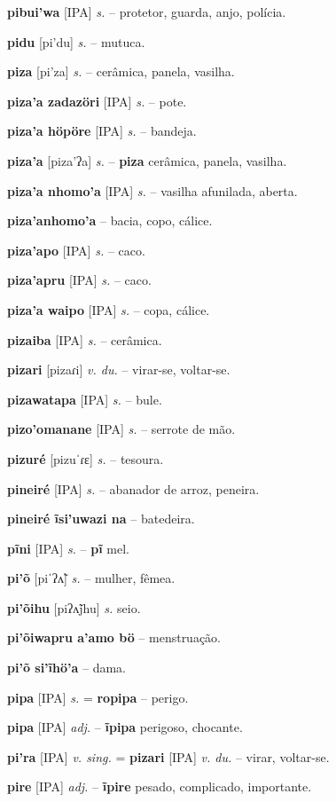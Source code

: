 \textbf{pibui'wa} [IPA] \textit{s.} -- protetor, guarda, anjo, polícia.

\textbf{pidu} [pi'du] \textit{s.} -- mutuca.

\textbf{piza} [pi'za] \textit{s.} -- cerâmica, panela, vasilha.

\textbf{piza'a zadazöri} [IPA] \textit{s.} -- pote.

\textbf{piza'a höpöre} [IPA] \textit{s.} -- bandeja.

\textbf{piza'a} [piza'ʔa] \textit{s.} -- \textbf{piza} cerâmica, panela, vasilha.

\textbf{piza'a nhomo'a} [IPA] \textit{s.} -- vasilha afunilada, aberta.

\textbf{piza'anhomo'a} -- bacia, copo, cálice.

\textbf{piza'apo} [IPA] \textit{s.} -- caco.

\textbf{piza'apru} [IPA] \textit{s.} -- caco.

\textbf{piza'a waipo} [IPA] \textit{s.} -- copa, cálice.

\textbf{pizaiba} [IPA] \textit{s.} -- cerâmica.

\textbf{pizari} [pizaɾi] \textit{v. du.} -- virar-se, voltar-se.

\textbf{pizawatapa} [IPA] \textit{s.} -- bule.

\textbf{pizo'omanane} [IPA] \textit{s.} -- serrote de mão.

\textbf{pizuré} [pizuˈɾɛ] \textit{s.} -- tesoura.

\textbf{pineiré} [IPA] \textit{s.} -- abanador de arroz, peneira.

\textbf{pineiré ĩsi'uwazi na} -- batedeira.

\textbf{pĩni} [IPA] \textit{s.} -- \textbf{pĩ} mel.

\textbf{pi'õ} [piˈʔʌ̃] \textit{s.} -- mulher, fêmea.

\textbf{pi'õihu} [piʔʌ̃jhu] \textit{s.} seio.

\textbf{pi'õiwapru a'amo bö} -- menstruação.

\textbf{pi'õ si'ĩhö'a} -- dama.

\textbf{pipa} [IPA] \textit{s.} = \textbf{ropipa} -- perigo.

\textbf{pipa} [IPA] \textit{adj.} -- \textbf{ĩpipa} perigoso, chocante.

\textbf{pi'ra} [IPA] \textit{v. sing.} = \textbf{pizari} [IPA] \textit{v. du.} -- virar, voltar-se.

\textbf{pire} [IPA] \textit{adj.} -- \textbf{ĩpire} pesado, complicado, importante.

